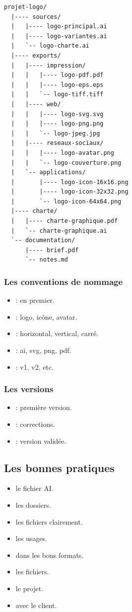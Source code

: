\begin{verbatim}
projet-logo/
  |---- sources/
  |   |---- logo-principal.ai
  |   |---- logo-variantes.ai
  |   `-- logo-charte.ai
  |---- exports/
  |   |---- impression/
  |   |   |---- logo-pdf.pdf
  |   |   |---- logo-eps.eps
  |   |   `-- logo-tiff.tiff
  |   |---- web/
  |   |   |---- logo-svg.svg
  |   |   |---- logo-png.png
  |   |   `-- logo-jpeg.jpg
  |   |---- reseaux-sociaux/
  |   |   |---- logo-avatar.png
  |   |   `-- logo-couverture.png
  |   `-- applications/
  |       |---- logo-icon-16x16.png
  |       |---- logo-icon-32x32.png
  |       `-- logo-icon-64x64.png
  |---- charte/
  |   |---- charte-graphique.pdf
  |   `-- charte-graphique.ai
  `-- documentation/
      |---- brief.pdf
      `-- notes.md
\end{verbatim}

\subsubsection{Les conventions de nommage}

\begin{itemize}
    \item {} : en premier.
    \item {} : logo, icône, avatar.
    \item {} : horizontal, vertical, carré.
    \item {} : ai, svg, png, pdf.
    \item {} : v1, v2, etc.
\end{itemize}

\subsubsection{Les versions}

\begin{itemize}
    \item {} : première version.
    \item {} : corrections.
    \item {} : version validée.
\end{itemize}

\subsection{Les bonnes pratiques}

\begin{itemize}
    \item {} le fichier AI.
    \item {} les dossiers.
    \item {} les fichiers clairement.
    \item {} les usages.
    \item {} dans les bons formats.
    \item {} les fichiers.
    \item {} le projet.
    \item {} avec le client.
\end{itemize}

